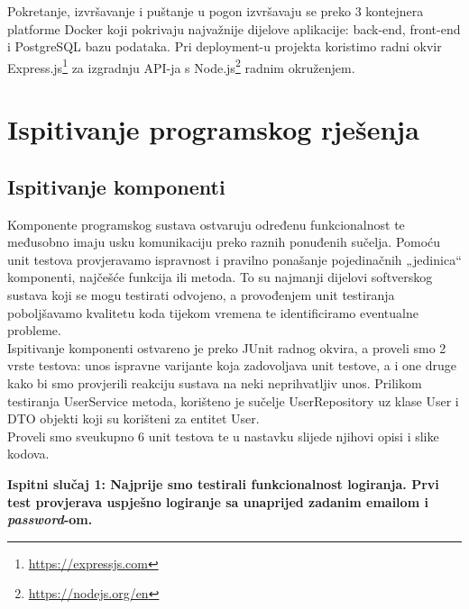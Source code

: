 Pokretanje, izvršavanje i puštanje u pogon izvršavaju se preko 3 kontejnera platforme Docker koji pokrivaju najvažnije dijelove aplikacije: back-end, front-end i PostgreSQL bazu podataka. Pri deployment-u projekta koristimo radni okvir Express.js\footnote{\url{https://expressjs.com}} za izgradnju API-ja s Node.js\footnote{\url{https://nodejs.org/en}} radnim okruženjem.

			
			\eject 
		
	
		\section{Ispitivanje programskog rješenja}
	
			
			\subsection{Ispitivanje komponenti}
			
			Komponente programskog sustava ostvaruju određenu funkcionalnost te međusobno imaju usku komunikaciju preko raznih ponuđenih sučelja. Pomoću unit testova provjeravamo ispravnost i pravilno ponašanje pojedinačnih „jedinica“ komponenti, najčešće funkcija ili metoda. To su najmanji dijelovi softverskog sustava koji se mogu testirati odvojeno, a provođenjem unit testiranja poboljšavamo kvalitetu koda tijekom vremena te identificiramo eventualne probleme. \\
			
Ispitivanje komponenti ostvareno je preko JUnit radnog okvira, a proveli smo 2 vrste testova: unos ispravne varijante koja zadovoljava unit testove, a i one druge kako bi smo provjerili reakciju sustava na neki neprihvatljiv unos.  Prilikom testiranja UserService metoda, korišteno je sučelje UserRepository uz klase User i DTO objekti koji su korišteni za entitet User.\\
Proveli smo sveukupno 6 unit testova te u nastavku slijede njihovi opisi i slike kodova.

\pagebreak

\textbf{Ispitni slučaj 1: Najprije smo testirali funkcionalnost logiranja. Prvi test provjerava uspješno logiranje sa unaprijed zadanim emailom i \textit{password}-om.}

